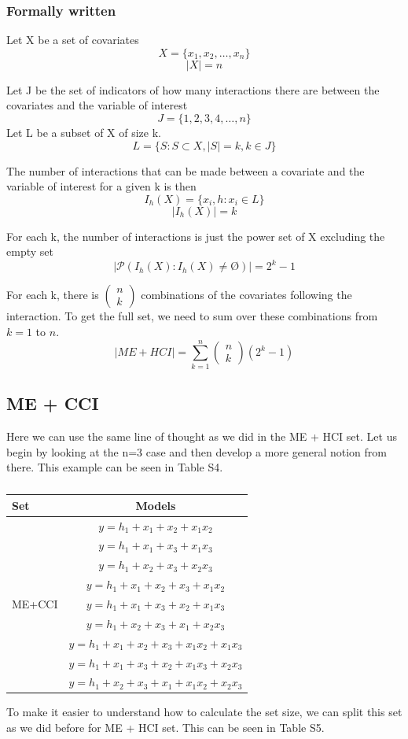 \subsubsection{Formally written}
Let X be a set of covariates 
\[X=\{\left.x_1,x_2,\dots ,x_n\right.\}\] 
\[|X|=n\] 

Let J be the set of indicators of how many interactions there are between the covariates and the variable of interest 
\[J=\{\left.1,2,3,4,\dots ,n\right.\}\] 
Let L be a subset of X of size k.
\[L=\{\left.S:S\subset X,\left|S\right|=k,k\in J\right.\}\] 

The number of interactions that can be made between a covariate and the variable of interest for a given k is then
\[I_h\left(X\right)=\{\left.\left.x_i,h\right.:x_i\in L\right.\}\] 
\[\left|I_h\left(X\right)\right|=k\] 

For each k, the number of interactions is just the power set of X excluding the empty set
\[\left|\mathcal{P}\left(I_h\left(X\right):I_h\left(X\right)\neq \textrm{\O}\right)\right|=2^k-1\] 

For each k, there is $\left( \begin{array}{c}
n \\ 
k \end{array}
\right)$ combinations of the covariates following the interaction. To get the full set, we need to sum over these combinations from $k=1$ to $n$.
\[\left|ME+HCI\right|=\sum^n_{k=1}{\left( \begin{array}{c}
n \\ 
k \end{array}
\right)\left(2^k-1\right)}\] 
\textbf{}

\subsection{ME + CCI}

Here we can use the same line of thought as we did in the ME + HCI set. Let us begin by looking at the n=3 case and then develop a more general notion from there. This example can be seen in Table S4. 
\begin{table}
\centering
\caption{}
\begin{tabular}{lc} \hline 
\toprule
Set & Models \\
\midrule
\multirow{9}{*}{ME+CCI} & $y=h_1+x_1+x_2+x_1x_2$\\ & $y=h_1+x_1+x_3+x_1x_3$\\ & $y=h_1+x_2+x_3+x_2x_3$\\ & $y=h_1+x_1+x_2+x_3+x_1x_2$\\ & $y=h_1+x_1+x_3+x_2+x_1x_3$\\ & $y=h_1+x_2+x_3+x_1+x_2x_3$\\ & $y=h_1+x_1+x_2+x_3+x_1x_2+x_1x_3$\\ & $y=h_1+x_1+x_3+x_2+x_1x_3+x_2x_3$\\ & $y=h_1+x_2+x_3+x_1+x_1x_2+x_2x_3$ \\
\bottomrule
\end{tabular}
\end{table}
To make it easier to understand how to calculate the set size, we can split this set as we did before for ME + HCI set. This can be seen in Table S5.

